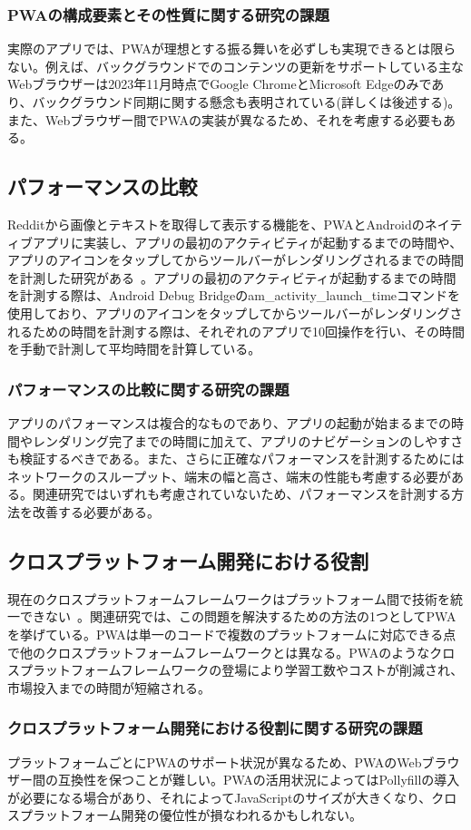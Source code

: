 \subsubsection{PWAの構成要素とその性質に関する研究の課題}\label{subsubsection:PWAの構成要素とその性質に関する研究の課題}
実際のアプリでは、PWAが理想とする振る舞いを必ずしも実現できるとは限らない。例えば、バックグラウンドでのコンテンツの更新をサポートしている主なWebブラウザーは2023年11月時点でGoogle ChromeとMicrosoft Edgeのみであり、バックグラウンド同期に関する懸念も表明されている(詳しくは後述する)。また、Webブラウザー間でPWAの実装が異なるため、それを考慮する必要もある。
\subsection{パフォーマンスの比較}\label{subsection:パフォーマンスの比較}
Redditから画像とテキストを取得して表示する機能を、PWAとAndroidのネイティブアプリに実装し、アプリの最初のアクティビティが起動するまでの時間や、アプリのアイコンをタップしてからツールバーがレンダリングされるまでの時間を計測した研究がある~\cite{Andreas2018ProgressiveWebApps}。アプリの最初のアクティビティが起動するまでの時間を計測する際は、Android Debug Bridgeのam\_activity\_launch\_timeコマンドを使用しており、アプリのアイコンをタップしてからツールバーがレンダリングされるための時間を計測する際は、それぞれのアプリで10回操作を行い、その時間を手動で計測して平均時間を計算している。
\subsubsection{パフォーマンスの比較に関する研究の課題}\label{subsubsection:パフォーマンスの比較に関する研究の課題}
アプリのパフォーマンスは複合的なものであり、アプリの起動が始まるまでの時間やレンダリング完了までの時間に加えて、アプリのナビゲーションのしやすさも検証するべきである。また、さらに正確なパフォーマンスを計測するためにはネットワークのスループット、端末の幅と高さ、端末の性能も考慮する必要がある。関連研究ではいずれも考慮されていないため、パフォーマンスを計測する方法を改善する必要がある。
\subsection{クロスプラットフォーム開発における役割}\label{subsection:クロスプラットフォーム開発における役割}
現在のクロスプラットフォームフレームワークはプラットフォーム間で技術を統一できない~\cite{Majchrzak2018ProgressiveWebApps}。関連研究では、この問題を解決するための方法の1つとしてPWAを挙げている。PWAは単一のコードで複数のプラットフォームに対応できる点で他のクロスプラットフォームフレームワークとは異なる。PWAのようなクロスプラットフォームフレームワークの登場により学習工数やコストが削減され、市場投入までの時間が短縮される。
\subsubsection{クロスプラットフォーム開発における役割に関する研究の課題}\label{subsubsection:クロスプラットフォーム開発における役割に関する研究の課題}
プラットフォームごとにPWAのサポート状況が異なるため、PWAのWebブラウザー間の互換性を保つことが難しい。PWAの活用状況によってはPollyfillの導入が必要になる場合があり、それによってJavaScriptのサイズが大きくなり、クロスプラットフォーム開発の優位性が損なわれるかもしれない。